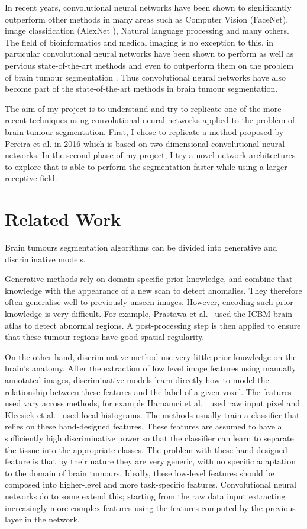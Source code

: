 \documentclass[12pt,a4paper,twoside,openright]{report}
\begin{document}
In recent years, convolutional neural networks have been shown to significantly outperform other methods in many areas such as Computer Vision (FaceNet\cite{face_net}), image classification (AlexNet \cite{alex_net}), Natural language processing \cite{nlp_deep_learning} and many others. The field of bioinformatics and medical imaging is no exception to this, in particular convolutional neural networks have been shown to perform as well as pervious state-of-the-art methods and even to outperform them on the problem of brain tumour segmentation \cite{pereira} \cite{brats_cnn_with_crf}. Thus convolutional neural networks have also become part of the state-of-the-art methods in brain tumour segmentation. 

The aim of my project is to understand and try to replicate one of the more recent techniques using convolutional neural networks applied to the problem of brain tumour segmentation. First, I chose to replicate a method proposed by Pereira et al.\cite{pereira} in 2016 which is based on two-dimensional convolutional neural networks. In the second phase of my project, I try a novel network architectures to explore that is able to perform the segmentation faster while using a larger receptive field. 

\section{Related Work}
Brain tumours segmentation algorithms can be divided into generative and discriminative models.

Generative methods rely on domain-specific prior knowledge, and combine that knowledge with the appearance of a new scan to detect anomalies. They therefore often generalise well to previously unseen images. However, encoding such prior knowledge is very difficult. For example, Prastawa et al.\ \cite{prastawa} used the ICBM brain atlas to detect abnormal regions. A post-processing step is then applied to ensure that these tumour regions have good spatial regularity.

On the other hand, discriminative method use very little prior knowledge on the brain's anatomy. After the extraction of low level image features using manually annotated images, discriminative models learn directly how to model the relationship between these features and the label of a given voxel. The features used vary across methods, for example Hamamci et al.\ \cite{hamamci} used raw input pixel and Kleesiek et al.\ \cite{kleesiek} used local histograms. The methods usually train a classifier that relies on these hand-designed features. These features are assumed to have a sufficiently high discriminative power so that the classifier can learn to separate the tissue into the appropriate classes. The problem with these hand-designed feature is that by their nature they are very generic, with no specific adaptation to the domain of brain tumours. Ideally, these low-level features should be composed into higher-level and more task-specific features. Convolutional neural networks do to some extend this; starting from the raw data input extracting increasingly more complex features using the features computed by the previous layer in the network.
\end{document}
